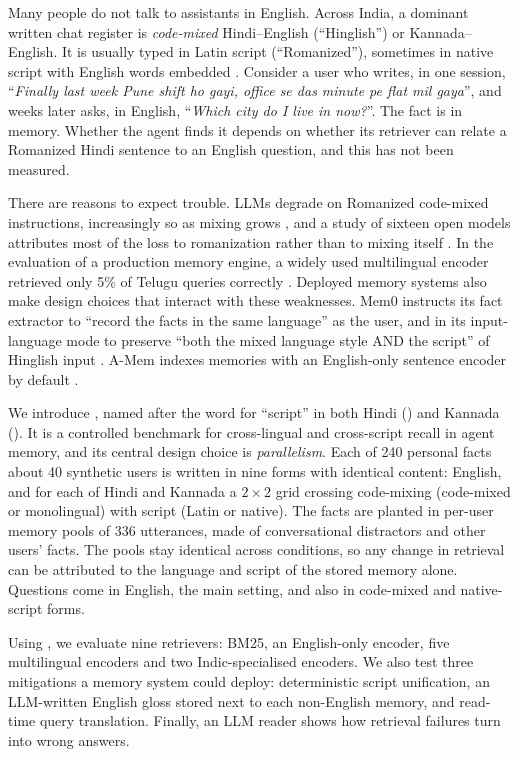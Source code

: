 Many people do not talk to assistants in English. Across India, a dominant written chat register is \emph{code-mixed} Hindi--English (``Hinglish'') or Kannada--English. It is usually typed in Latin script (``Romanized''), sometimes in native script with English words embedded \citep{bali2014borrowing}. Consider a user who writes, in one session, ``\emph{Finally last week Pune shift ho gayi, office se das minute pe flat mil gaya}'', and weeks later asks, in English, ``\emph{Which city do I live in now?}''. The fact is in memory. Whether the agent finds it depends on whether its retriever can relate a Romanized Hindi sentence to an English question, and this has not been measured.

There are reasons to expect trouble. LLMs degrade on Romanized code-mixed instructions, increasingly so as mixing grows \citep{das2026indiromcom}, and a study of sixteen open models attributes most of the loss to romanization rather than to mixing itself \citep{codemixtax2026}. In the evaluation of a production memory engine, a widely used multilingual encoder retrieved only 5\% of Telugu queries correctly \citep{kim2026tablet2}. Deployed memory systems also make design choices that interact with these weaknesses. Mem0 instructs its fact extractor to ``record the facts in the same language'' as the user, and in its input-language mode to preserve ``both the mixed language style AND the script'' of Hinglish input \citep{mem0repo}. A-Mem indexes memories with an English-only sentence encoder by default \citep{amemrepo}.

We introduce \lipi{}, named after the word for ``script'' in both Hindi (\devlipi) and Kannada (\kanlipi). It is a controlled benchmark for cross-lingual and cross-script recall in agent memory, and its central design choice is \emph{parallelism}. Each of 240 personal facts about 40 synthetic users is written in nine forms with identical content: English, and for each of Hindi and Kannada a $2\times2$ grid crossing code-mixing (code-mixed or monolingual) with script (Latin or native). The facts are planted in per-user memory pools of 336 utterances, made of conversational distractors and other users' facts. The pools stay identical across conditions, so any change in retrieval can be attributed to the language and script of the stored memory alone. Questions come in English, the main setting, and also in code-mixed and native-script forms.

Using \lipi{}, we evaluate nine retrievers: BM25, an English-only encoder, five multilingual encoders and two Indic-specialised encoders. We also test three mitigations a memory system could deploy: deterministic script unification, an LLM-written English gloss stored next to each non-English memory, and read-time query translation. Finally, an LLM reader shows how retrieval failures turn into wrong answers.

